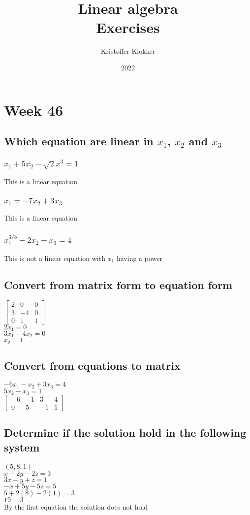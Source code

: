 \documentclass[12pt, a4paper]{article}
\title{Linear algebra\\ Exercises}
\date{2022}
\author{Kristoffer Klokker}
\begin{document}
	\maketitle
	\clearpage
	\tableofcontents
	\clearpage
	\section{Week 46}
		\subsection{Which equation are linear in $x_1$, $x_2$ and $x_3$}
			\subsubsection{$x_1+5x_2-\sqrt{2}x^3=1$}
				This is a linear equation
			\subsubsection{$x_1=-7x_2+3x_3$}
				This is a linear equation
			\subsubsection{$x_1^{3/5}-2x_2+x_3=4$}
				This is not a linear equation with $x_1$ having a power
		\subsection{Convert from matrix form to equation form}
			$\begin{bmatrix}
				2 & 0 & 0 \\
				3 & -4 & 0\\
				0 & 1 & 1 
			\end{bmatrix}$\\
			$2x_1=0$\\
			$3x_1-4x_2=0$\\
			$x_2=1$
		\subsection{Convert from equations to matrix}
			$-6x_1-x_2+3x_3=4$\\
			$5x_2-x_3=1$\\
			$\begin{bmatrix}
				-6 & -1 & 3 & 4 \\
				0 & 5 & -1 & 1
			\end{bmatrix}$
		\subsection{Determine if the solution hold in the following system}
			$(5,8,1)$\\
			$x+2y-2z=3$\\
			$3x-y+z=1$\\
			$-x+5y-5z=5$\\[4mm]
			$5+2(8)-2(1)=3$\\
			$19=3$\\
			By the first equation the solution does not hold
\end{document}
